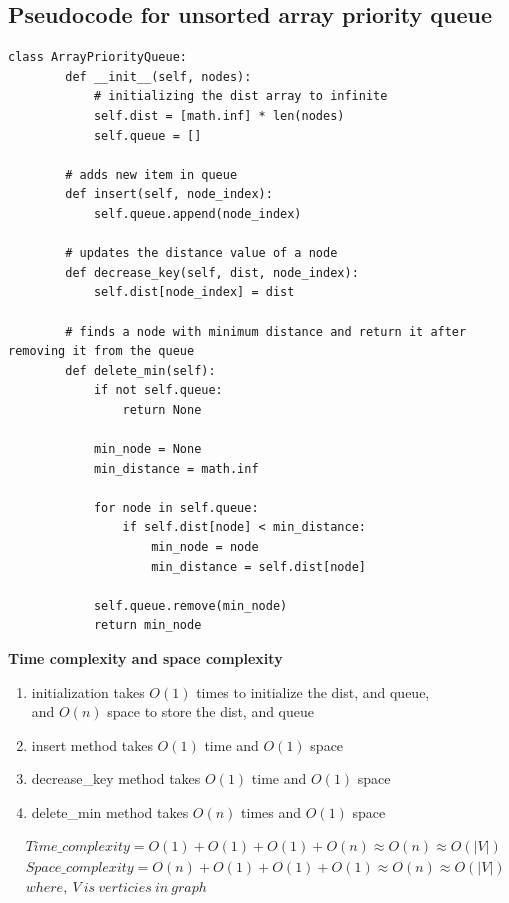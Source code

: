 \documentclass[12pt]{article}
\begin{document}
\newpage

\subsection{Pseudocode for unsorted array priority queue}
\begin{lstlisting}[style=mystyle]
    class ArrayPriorityQueue:
        def __init__(self, nodes):
            # initializing the dist array to infinite
            self.dist = [math.inf] * len(nodes)
            self.queue = []

        # adds new item in queue
        def insert(self, node_index):
            self.queue.append(node_index)
    
        # updates the distance value of a node
        def decrease_key(self, dist, node_index):
            self.dist[node_index] = dist
        
        # finds a node with minimum distance and return it after removing it from the queue
        def delete_min(self):
            if not self.queue:
                return None
    
            min_node = None
            min_distance = math.inf
    
            for node in self.queue:
                if self.dist[node] < min_distance:
                    min_node = node
                    min_distance = self.dist[node]
    
            self.queue.remove(min_node)
            return min_node
    \end{lstlisting}

\newpage

\noindent\textbf{Time complexity and space complexity} \\
\begin{enumerate}
    \item initialization takes $O(1)$ times to initialize the dist, and queue,\\
     and $O(n)$ space to store the dist, and queue
    \item insert method takes $O(1)$ time and $O(1)$ space
    \item decrease\_key method takes $O(1)$ time and $O(1)$ space 
    \item delete\_min method takes $O(n)$ times and $O(1)$ space 
\end{enumerate}
\begin{equation} %
\begin{split}
    &Time\_complexity = O(1) + O(1) + O(1) + O(n) \approx O(n) \approx O(|V|) \\
    &Space\_complexity = O(n) + O(1) + O(1) + O(1) \approx O(n) \approx O(|V|) \\
    &where,\ V \ is \ verticies \ in \ graph
\end{split}
\end{equation}
\end{document}
